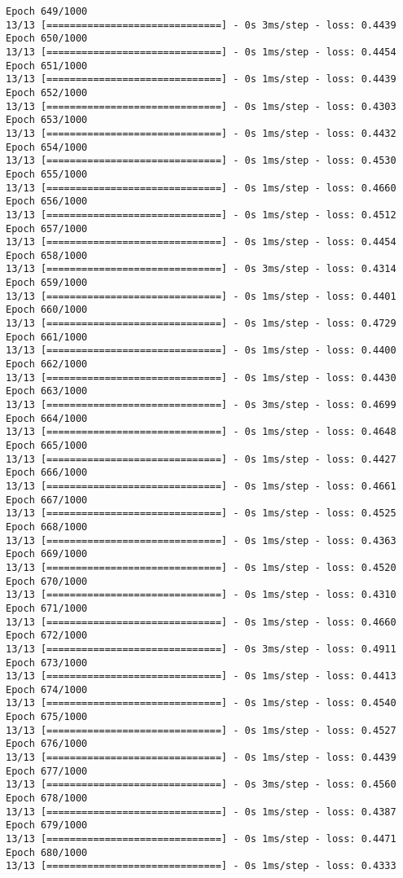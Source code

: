\documentclass[11pt]{article}
\begin{document}
\begin{Verbatim}[commandchars=\\\{\}]
Epoch 649/1000
13/13 [==============================] - 0s 3ms/step - loss: 0.4439
Epoch 650/1000
13/13 [==============================] - 0s 1ms/step - loss: 0.4454
Epoch 651/1000
13/13 [==============================] - 0s 1ms/step - loss: 0.4439
Epoch 652/1000
13/13 [==============================] - 0s 1ms/step - loss: 0.4303
Epoch 653/1000
13/13 [==============================] - 0s 1ms/step - loss: 0.4432
Epoch 654/1000
13/13 [==============================] - 0s 1ms/step - loss: 0.4530
Epoch 655/1000
13/13 [==============================] - 0s 1ms/step - loss: 0.4660
Epoch 656/1000
13/13 [==============================] - 0s 1ms/step - loss: 0.4512
Epoch 657/1000
13/13 [==============================] - 0s 1ms/step - loss: 0.4454
Epoch 658/1000
13/13 [==============================] - 0s 3ms/step - loss: 0.4314
Epoch 659/1000
13/13 [==============================] - 0s 1ms/step - loss: 0.4401
Epoch 660/1000
13/13 [==============================] - 0s 1ms/step - loss: 0.4729
Epoch 661/1000
13/13 [==============================] - 0s 1ms/step - loss: 0.4400
Epoch 662/1000
13/13 [==============================] - 0s 1ms/step - loss: 0.4430
Epoch 663/1000
13/13 [==============================] - 0s 3ms/step - loss: 0.4699
Epoch 664/1000
13/13 [==============================] - 0s 1ms/step - loss: 0.4648
Epoch 665/1000
13/13 [==============================] - 0s 1ms/step - loss: 0.4427
Epoch 666/1000
13/13 [==============================] - 0s 1ms/step - loss: 0.4661
Epoch 667/1000
13/13 [==============================] - 0s 1ms/step - loss: 0.4525
Epoch 668/1000
13/13 [==============================] - 0s 1ms/step - loss: 0.4363
Epoch 669/1000
13/13 [==============================] - 0s 1ms/step - loss: 0.4520
Epoch 670/1000
13/13 [==============================] - 0s 1ms/step - loss: 0.4310
Epoch 671/1000
13/13 [==============================] - 0s 1ms/step - loss: 0.4660
Epoch 672/1000
13/13 [==============================] - 0s 3ms/step - loss: 0.4911
Epoch 673/1000
13/13 [==============================] - 0s 1ms/step - loss: 0.4413
Epoch 674/1000
13/13 [==============================] - 0s 1ms/step - loss: 0.4540
Epoch 675/1000
13/13 [==============================] - 0s 1ms/step - loss: 0.4527
Epoch 676/1000
13/13 [==============================] - 0s 1ms/step - loss: 0.4439
Epoch 677/1000
13/13 [==============================] - 0s 3ms/step - loss: 0.4560
Epoch 678/1000
13/13 [==============================] - 0s 1ms/step - loss: 0.4387
Epoch 679/1000
13/13 [==============================] - 0s 1ms/step - loss: 0.4471
Epoch 680/1000
13/13 [==============================] - 0s 1ms/step - loss: 0.4333

\end{Verbatim}
\end{document}
